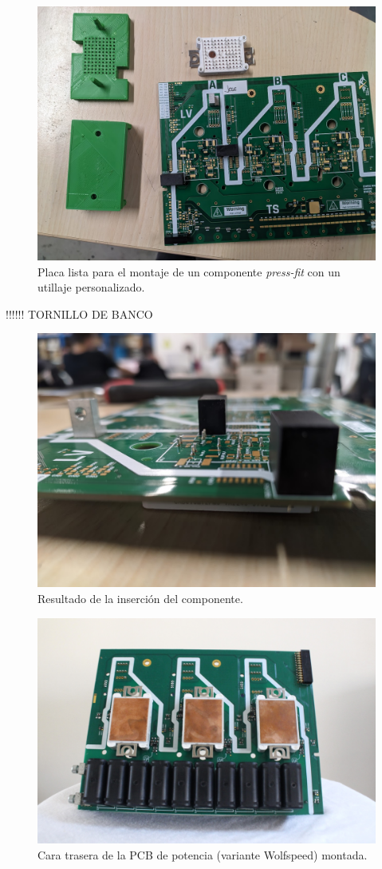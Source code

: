 \begin{figure}[H]
	\centering
	\includegraphics[width=0.7\linewidth]{fig/assembly4}
	\caption{Placa lista para el montaje de un componente \textit{press-fit} con un utillaje personalizado.}
\end{figure}

!!!!!! TORNILLO DE BANCO

\begin{figure}[H]
	\centering
	\includegraphics[width=0.7\linewidth]{fig/assembly5}
	\caption{Resultado de la inserción del componente.}
\end{figure}


\begin{figure}[H]
	\centering
	\includegraphics[width=0.7\linewidth]{fig/assembly8}
	\caption{Cara trasera de la PCB de potencia (variante Wolfspeed) montada.}
\end{figure}


